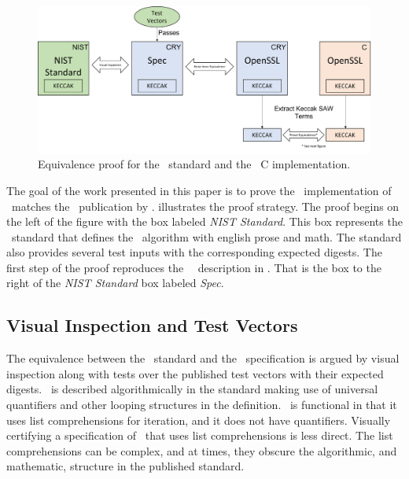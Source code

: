 \begin{figure}[t]
  \centering
  \includegraphics[width=\linewidth]{figs/proof.png}
  
  \caption{Equivalence proof for the \shaThree\ standard and the \openssl\ C implementation.}
  \label{fig:proofStructure}
  
\end{figure}

The goal of the work presented in this paper is to prove the \openssl\ implementation of \shaThree\ matches the \fips\ publication by \nist.
 illustrates the proof strategy.
The proof begins on the left of the figure with the box labeled \emph{NIST Standard}. 
This box represents the \fips\ standard that defines the \shaThree\ algorithm with english prose and math.
The standard also provides several test inputs with the corresponding expected digests.
The first step of the proof reproduces the \fips\ \shaThree\ description in \cryptol.
That is the box to the right of the \emph{NIST Standard} box labeled \emph{Spec}.

\subsection{Visual Inspection and Test Vectors}

The equivalence between the \fips\ standard and the \cryptol\ specification is argued by visual inspection along with tests over the published test vectors with their expected digests.
\shaThree\ is described algorithmically in the standard making use of universal quantifiers and other looping structures in the definition.
\cryptol\ is functional in that it uses list comprehensions for iteration, and it does not have quantifiers.
Visually certifying a specification of \shaThree\ that uses list comprehensions is less direct.
The list comprehensions can be complex, and at times, they obscure the algorithmic, and mathematic, structure in the published standard.

